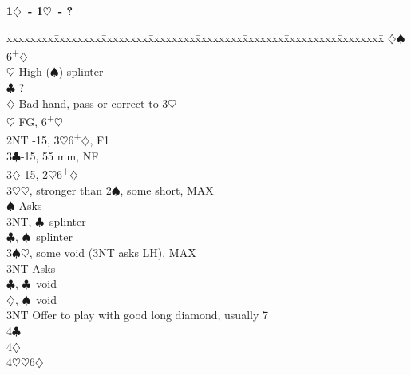 \documentclass[10pt]{article}
\renewcommand{\c}{$\clubsuit$}
\renewcommand{\d}{$\diamondsuit$}
\newcommand{\h}{$\heartsuit$}
\newcommand{\s}{$\spadesuit$}
\newcommand{\p}{\textsuperscript{+}}
\newcommand{\m}{\textsuperscript{\textminus}}
\newenvironment{bidtable}[1][]
{\textbf{#1}
  \begin{adjustwidth}{1em}{}
    \addvspace{2pt}
    \begin{tabbing}
      xxxxxxxx\=xxxxxxxx\=xxxxxxxx\=xxxxxxxx\=xxxxxxxx\=xxxxxxx\=xxxxxxxxx\=xxxxxxxx\=\kill}
{\end{tabbing}\end{adjustwidth}\bigskip}%
\begin{document}
\begin{bidtable}[1\d\ - 1\h\ - ?]
     \>      \d {}\s 6\p\d                                \\
     \>      \h \> High (\s) splinter                       \\
     \c  \> ?                                               \\
     \d  \> Bad hand, pass or correct to 3\h                \\
     \h  \> FG, 6\p\h                                       \\
2NT  -15, 3\h 6\p\d, F1                                    \\
3\c  {}-15, 55 mm, NF                                        \\
3\d  {}-15, 2\m\h 6\p\d                                      \\
3\h  {}\h, stronger than 2\s, some short, MAX                 \\
     \s  \> Asks                                            \\
     \>      \> 3NT, \c\ splinter                               \\
     \>      \c, \s\ splinter                               \\
3\s  {}\h, some void (3NT asks LH), MAX                       \\
     \> 3NT  \> Asks                                            \\
     \>      \c, \c\ void                                   \\
     \>      \d, \s\ void                                   \\
3NT  \> Offer to play with good long diamond, usually 7         \\
4\c  {}                                                    \\
4\d  {}                                                    \\
4\h  {}\h 6\d
\end{bidtable}
\end{document}
